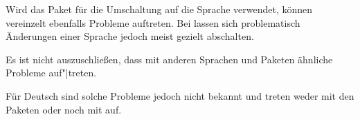 Wird das Paket  für die
Umschaltung auf die Sprache verwendet, können vereinzelt ebenfalls
Probleme auftreten. Bei  lassen sich problematisch Änderungen
einer Sprache jedoch meist gezielt abschalten.%
\iffalse%
\ Ist das Paket \Package{french} nicht installiert, ergibt sich das Problem
  mit \Package{babel} nicht.  Ebenfalls existiert das Problem normalerweise
  nicht, wenn man bei \Package{babel} anstelle der Sprache \PValue{french}
  eine der Sprachen \PValue{acadian}, \PValue{canadien} oder \PValue{francais}
  verwendet.
\fi

\iffalse%
Mit Babel ab Version 3.7j tritt dieses Problem jedoch nur noch auf, wenn per
Option explizit angegeben wird, dass \Package{babel} das
\Package{french}-Paket verwenden soll.
%
\iftrue
  Kann nicht sicher gestellt werden, dass nicht eine alte Version von
  \Package{babel} verwendet wird, so empfehle ich%
  \iftrue
    , mit
\begin{lstcode}
  \usepackage[...,francais,...]{babel}
\end{lstcode}
    französische Sprache auszuwählen. 
    \iffalse %
      Gegebenenfalls ist dann aber trotzdem  mit
      \Macro{selectlanguage}\PParameter{french} auf Französisch umzuschalten.%
    \fi%
  \else %
    \space bei \Package{babel} die Option \Option{frenchb}.%
  \fi 
\fi
\fi  

\iftrue
  Es ist nicht auszuschließen, dass mit anderen Sprachen und Paketen ähnliche
  Probleme auf"|treten.
  \iftrue 
    Für Deutsch sind solche Probleme jedoch nicht bekannt  und treten weder
    mit den Paketen  oder
     noch mit  auf.
  \else
    Für Deutsch treten solche Probleme mit den Paketen
    \Package{german}\IndexPackage{german},
    \Package{ngerman}\IndexPackage{ngerman} oder \Package{babel} jedoch nicht
    auf.
  \fi
\fi


